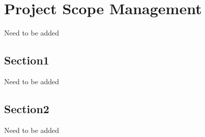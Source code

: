 \chapter{Project Scope Management}
Need to be added
\section{Section1}
Need to be added
\section{Section2}
Need to be added